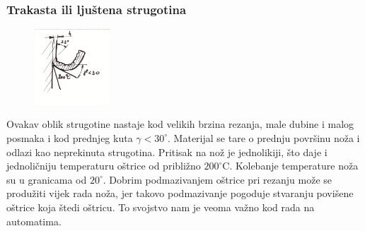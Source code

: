 \documentclass[a4paper,12pt]{article}
\numberwithin{figure}{section}
\begin{document}
\vspace{1cm}
\subsubsection*{Trakasta ili ljuštena strugotina}
\begin{figure}
\centering
\vspace{-0.5cm}
\includegraphics[width=0.25\textwidth]{image_06-1.png}
\end{figure}
\FloatBarrier
Ovakav oblik strugotine nastaje kod velikih brzina rezanja, male dubine i malog posmaka i kod prednjeg kuta $\gamma<30^{\circ}$. Materijal se tare o prednju površinu noža i odlazi kao neprekinuta strugotina. Pritisak na nož je jednolikiji, što daje i jednoličniju temperaturu oštrice od približno $200^{\circ}$C. Kolebanje temperature noža su u granicama od $20^{\circ}$. Dobrim podmazivanjem oštrice pri rezanju može se produžiti vijek rada noža, jer takovo podmazivanje pogoduje stvaranju povišene oštrice koja štedi oštricu. To svojstvo nam je veoma važno kod rada na automatima.
\end{document}
